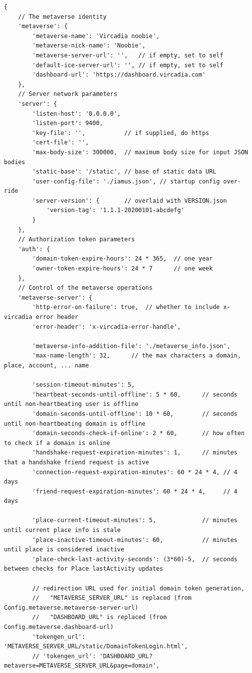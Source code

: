 \begin{verbatim}
{
    // The metaverse identity
    'metaverse': {
        'metaverse-name': 'Vircadia noobie',
        'metaverse-nick-name': 'Noobie',
        'metaverse-server-url': '',   // if empty, set to self
        'default-ice-server-url': '', // if empty, set to self
        'dashboard-url': 'https://dashboard.vircadia.com'
    },
    // Server network parameters
    'server': {
        'listen-host': '0.0.0.0',
        'listen-port': 9400,
        'key-file': '',           // if supplied, do https
        'cert-file': '',
        'max-body-size': 300000,  // maximum body size for input JSON bodies
        'static-base': '/static', // base of static data URL
        'user-config-file': './iamus.json', // startup config over-ride
        'server-version': {       // overlaid with VERSION.json
            'version-tag': '1.1.1-20200101-abcdefg'
        }
    },
    // Authorization token parameters
    'auth': {
        'domain-token-expire-hours': 24 * 365,  // one year
        'owner-token-expire-hours': 24 * 7      // one week
    },
    // Control of the metaverse operations
    'metaverse-server': {
        'http-error-on-failure': true,  // whether to include x-vircadia error header
        'error-header': 'x-vircadia-error-handle',

        'metaverse-info-addition-file': './metaverse_info.json',
        'max-name-length': 32,      // the max characters a domain, place, account, ... name

        'session-timeout-minutes': 5,
        'heartbeat-seconds-until-offline': 5 * 60,      // seconds until non-heartbeating user is offline
        'domain-seconds-until-offline': 10 * 60,        // seconds until non-heartbeating domain is offline
        'domain-seconds-check-if-online': 2 * 60,       // how often to check if a domain is online
        'handshake-request-expiration-minutes': 1,      // minutes that a handshake friend request is active
        'connection-request-expiration-minutes': 60 * 24 * 4, // 4 days
        'friend-request-expiration-minutes': 60 * 24 * 4,     // 4 days

        'place-current-timeout-minutes': 5,             // minutes until current place info is stale
        'place-inactive-timeout-minutes': 60,           // minutes until place is considered inactive
        'place-check-last-activity-seconds': (3*60)-5,  // seconds between checks for Place lastActivity updates

        // redirection URL used for initial domain token generation,
        //   "METAVERSE_SERVER_URL" is replaced (from Config.metaverse.metaverse-server-url)
        //   "DASHBOARD_URL" is replaced (from Config.metaverse.dashboard-url)
        'tokengen_url': 'METAVERSE_SERVER_URL/static/DomainTokenLogin.html',
        // 'tokengen_url': 'DASHBOARD_URL?metaverse=METAVERSE_SERVER_URL&page=domain',


\end{verbatim}
